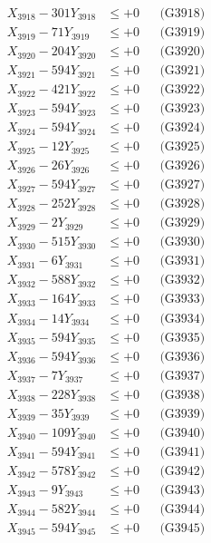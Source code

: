 \documentclass[a4paper,10pt]{article}
\begin{document}
{\begin{align}
X_{3918} - 301Y_{3918} &\leq +0 && \text{(G3918)} \\
X_{3919} - 71Y_{3919} &\leq +0 && \text{(G3919)} \\
X_{3920} - 204Y_{3920} &\leq +0 && \text{(G3920)} \\
\allowbreak
X_{3921} - 594Y_{3921} &\leq +0 && \text{(G3921)} \\
X_{3922} - 421Y_{3922} &\leq +0 && \text{(G3922)} \\
X_{3923} - 594Y_{3923} &\leq +0 && \text{(G3923)} \\
X_{3924} - 594Y_{3924} &\leq +0 && \text{(G3924)} \\
X_{3925} - 12Y_{3925} &\leq +0 && \text{(G3925)} \\
X_{3926} - 26Y_{3926} &\leq +0 && \text{(G3926)} \\
X_{3927} - 594Y_{3927} &\leq +0 && \text{(G3927)} \\
X_{3928} - 252Y_{3928} &\leq +0 && \text{(G3928)} \\
X_{3929} - 2Y_{3929} &\leq +0 && \text{(G3929)} \\
X_{3930} - 515Y_{3930} &\leq +0 && \text{(G3930)} \\
\allowbreak
X_{3931} - 6Y_{3931} &\leq +0 && \text{(G3931)} \\
X_{3932} - 588Y_{3932} &\leq +0 && \text{(G3932)} \\
X_{3933} - 164Y_{3933} &\leq +0 && \text{(G3933)} \\
X_{3934} - 14Y_{3934} &\leq +0 && \text{(G3934)} \\
X_{3935} - 594Y_{3935} &\leq +0 && \text{(G3935)} \\
X_{3936} - 594Y_{3936} &\leq +0 && \text{(G3936)} \\
X_{3937} - 7Y_{3937} &\leq +0 && \text{(G3937)} \\
X_{3938} - 228Y_{3938} &\leq +0 && \text{(G3938)} \\
X_{3939} - 35Y_{3939} &\leq +0 && \text{(G3939)} \\
X_{3940} - 109Y_{3940} &\leq +0 && \text{(G3940)} \\
\allowbreak
X_{3941} - 594Y_{3941} &\leq +0 && \text{(G3941)} \\
X_{3942} - 578Y_{3942} &\leq +0 && \text{(G3942)} \\
X_{3943} - 9Y_{3943} &\leq +0 && \text{(G3943)} \\
X_{3944} - 582Y_{3944} &\leq +0 && \text{(G3944)} \\
X_{3945} - 594Y_{3945} &\leq +0 && \text{(G3945)} \\

\end{align}}
\end{document}
